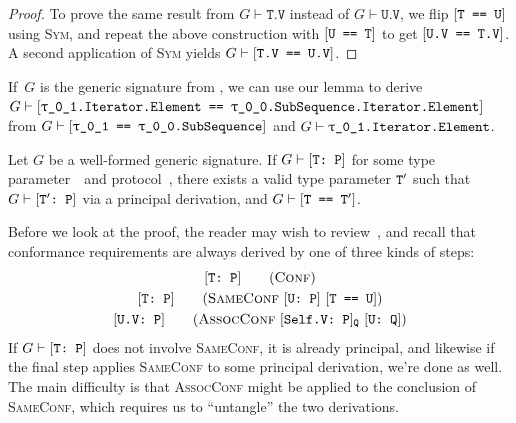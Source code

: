 \documentclass[../generics]{subfiles}
\begin{document}
\begin{proof}
To prove the same result from $G\vdash\texttt{T.V}$ instead of $G\vdash\texttt{U.V}$, we flip $[\texttt{T == U}]$ using \textsc{Sym}, and repeat the above construction with $[\texttt{U == T}]$ to get $[\texttt{U.V == T.V}]$. A second application of \textsc{Sym} yields $G\vdash[\texttt{T.V == U.V}]$.
\end{proof}

\begin{example}
If~$G$ is the generic signature from , we can use our lemma to derive $G\vdash\SameReq{\rU.Iterator.Element}{\rT.SubSequence.Iterator.Element}$ from $G\vdash\SameReq{\rU}{\rT.SubSequence}$ and $G\vdash\texttt{\rU.Iterator.Element}$.
\end{example}

\newcommand{\AssocConfStepDefX}{\ConfReq{U.V}{P}\tag{\textsc{AssocConf} $\AssocConfReq{Self.V}{P}{Q}$ $\ConfReq{U}{Q}$}}

\begin{theorem}\label{conformance paths theorem} Let $G$ be a well-formed generic signature. If $G\vdash[\texttt{T:~P}]$ for some type parameter~\tT\ and protocol~\tP, there exists a valid type parameter $\texttt{T}'$ such that $G\vdash[\texttt{$\texttt{T}'$:~P}]$ via a principal derivation, and $G\vdash[\texttt{T == $\texttt{T}'$}]$.
\end{theorem}

Before we look at the proof, the reader may wish to review~, and recall that conformance requirements are always derived by one of three kinds of steps:
\begin{gather*}
\ConfStepDef\\
\SameConfStepDef\\
\AssocConfStepDefX
\end{gather*}
If $G\vdash[\texttt{T:~P}]$ does not involve \textsc{SameConf}, it is already principal, and likewise if the final step applies \textsc{SameConf} to some principal derivation, we're done as well. The main difficulty is that \textsc{AssocConf} might be applied to the conclusion of \textsc{SameConf}, which requires us to ``untangle'' the two derivations.
\end{document}
